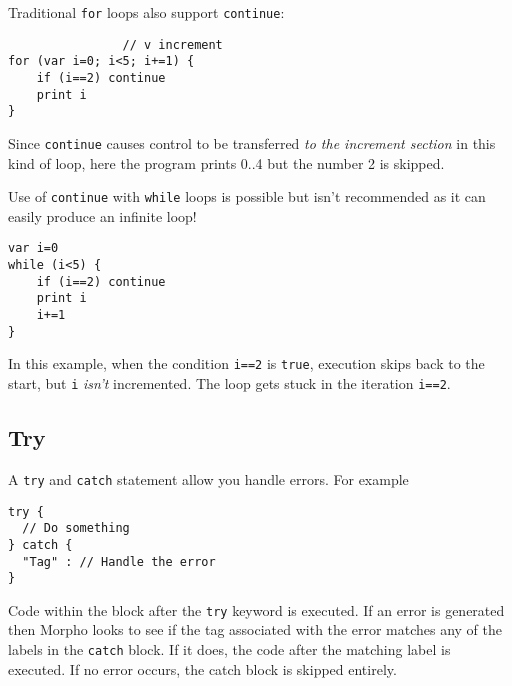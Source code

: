 Traditional \texttt{for} loops also support \texttt{continue}:

\begin{lstlisting}
                // v increment
for (var i=0; i<5; i+=1) {
    if (i==2) continue
    print i
}
\end{lstlisting}

Since \texttt{continue} causes control to be transferred \emph{to the
increment section} in this kind of loop, here the program prints 0..4
but the number 2 is skipped.

Use of \texttt{continue} with \texttt{while} loops is possible but isn't
recommended as it can easily produce an infinite loop!

\begin{lstlisting}
var i=0
while (i<5) {
    if (i==2) continue
    print i
    i+=1
}
\end{lstlisting}

In this example, when the condition \texttt{i==2} is \texttt{true},
execution skips back to the start, but \texttt{i} \emph{isn't}
incremented. The loop gets stuck in the iteration \texttt{i==2}.

\hypertarget{try}{%
\subsection{Try}\label{try}}

A \texttt{try} and \texttt{catch} statement allow you handle errors. For
example

\begin{lstlisting}
try {
  // Do something
} catch {
  "Tag" : // Handle the error
}
\end{lstlisting}

Code within the block after the \texttt{try} keyword is executed. If an
error is generated then Morpho looks to see if the tag associated with
the error matches any of the labels in the \texttt{catch} block. If it
does, the code after the matching label is executed. If no error occurs,
the catch block is skipped entirely.
